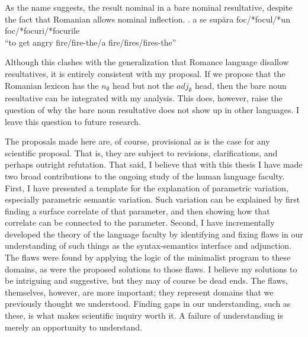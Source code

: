 \documentclass[MilwayThesis]{subfiles}
\begin{document}
As the name suggests, the result nominal in a bare nominal resultative, despite the fact that Romanian allows nominal inflection.
\ex. a se sup\u{a}ra foc/*focul/*un foc/*focuri/*focurile\\
``to get angry fire/fire-the/a fire/fires/fires-the'' \parencite{farkas2011predicative}

Although this clashes with the generalization that Romance language disallow resultatives, it is entirely consistent with my proposal.
If we propose that the Romanian lexicon has the $n_{\emptyset}$ head but not the $adj_{\emptyset}$ head, then the bare noun resultative can be integrated with my analysis.
This does, however, raise the question of why the bare noun resultative does not show up in other languages.
I leave this question to future research.


The proposals made here are, of course, provisional as is the case for any scientific proposal.
That is, they are subject to revisions, clarifications, and perhaps outright refutation.
That said, I believe that with this thesis I have made two broad contributions to the ongoing study of the human language faculty.
First, I have presented a template for the explanation of parametric variation, especially parametric semantic variation.
Such variation can be explained by first finding a surface correlate of that parameter, and then showing how that correlate can be connected to the parameter.
Second, I have incrementally developed the theory of the language faculty by identifying and fixing flaws in our understanding of such things as the syntax-semantics interface and adjunction.
The flaws were found by applying the logic of the minimalist program to these domains, as were the proposed solutions to those flaws.
I believe my solutions to be intriguing and suggestive, but they may of course be dead ends.
The flaws, themselves, however, are more important; they represent domains that we previously thought we understood.
Finding gaps in our understanding, such as these, is what makes scientific inquiry worth it.
A failure of understanding is merely an opportunity to understand.
\end{document}
